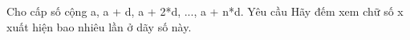Cho cấp số cộng a, a + d, a + 2*d, ..., a + n*d.
Yêu cầu
Hãy đếm xem chữ số x xuất hiện bao nhiêu lần ở dãy số này.